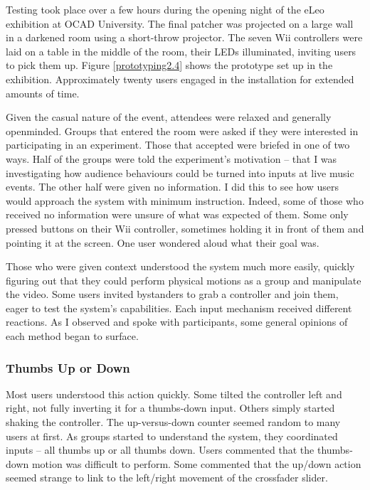 Testing took place over a few hours during the opening night of the eLeo exhibition at OCAD University. The final patcher was projected on a large wall in a darkened room using a short-throw projector. The seven Wii controllers were laid on a table in the middle of the room, their LEDs illuminated, inviting users to pick them up. Figure \ref{prototyping2.4} shows the prototype set up in the exhibition. Approximately twenty users engaged in the installation for extended amounts of time.

Given the casual nature of the event, attendees were relaxed and generally openminded. Groups that entered the room were asked if they were interested in participating in an experiment. Those that accepted were briefed in one of two ways. Half of the groups were told the experiment's motivation -- that I was investigating how audience behaviours could be turned into inputs at live music events. The other half were given no information. I did this to see how users would approach the system with minimum instruction. Indeed, some of those who received no information were unsure of what was expected of them. Some only pressed buttons on their Wii controller, sometimes holding it in front of them and pointing it at the screen. One user wondered aloud what their goal was.

Those who were given context understood the system much more easily, quickly figuring out that they could perform physical motions as a group and manipulate the video. Some users invited bystanders to grab a controller and join them, eager to test the system's capabilities. Each input mechanism received different reactions. As I observed and spoke with participants, some general opinions of each method began to surface.

\subsubsection{Thumbs Up or Down}
Most users understood this action quickly. Some tilted the controller left and right, not fully inverting it for a thumbs-down input. Others simply started shaking the controller. The up-versus-down counter seemed random to many users at first. As groups started to understand the system, they coordinated inputs -- all thumbs up or all thumbs down. Users commented that the thumbs-down motion was difficult to perform. Some commented that the up/down action seemed strange to link to the left/right movement of the crossfader slider.

